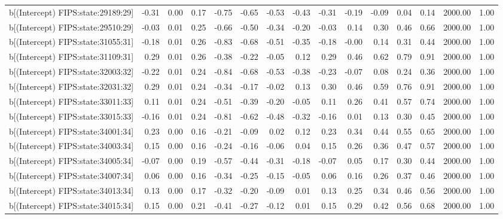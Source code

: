 \begin{table}[ht]
\begin{tabular}{rrrrrrrrrrrrrrr}
  b[(Intercept) FIPS:state:29189:29] & -0.31 & 0.00 & 0.17 & -0.75 & -0.65 & -0.53 & -0.43 & -0.31 & -0.19 & -0.09 & 0.04 & 0.14 & 2000.00 & 1.00 \\ 
  b[(Intercept) FIPS:state:29510:29] & -0.03 & 0.01 & 0.25 & -0.66 & -0.50 & -0.34 & -0.20 & -0.03 & 0.14 & 0.30 & 0.46 & 0.66 & 2000.00 & 1.00 \\ 
  b[(Intercept) FIPS:state:31055:31] & -0.18 & 0.01 & 0.26 & -0.83 & -0.68 & -0.51 & -0.35 & -0.18 & -0.00 & 0.14 & 0.31 & 0.44 & 2000.00 & 1.00 \\ 
  b[(Intercept) FIPS:state:31109:31] & 0.29 & 0.01 & 0.26 & -0.38 & -0.22 & -0.05 & 0.12 & 0.29 & 0.46 & 0.62 & 0.79 & 0.91 & 2000.00 & 1.00 \\ 
  b[(Intercept) FIPS:state:32003:32] & -0.22 & 0.01 & 0.24 & -0.84 & -0.68 & -0.53 & -0.38 & -0.23 & -0.07 & 0.08 & 0.24 & 0.36 & 2000.00 & 1.00 \\ 
  b[(Intercept) FIPS:state:32031:32] & 0.29 & 0.01 & 0.24 & -0.34 & -0.17 & -0.02 & 0.13 & 0.30 & 0.46 & 0.59 & 0.76 & 0.91 & 2000.00 & 1.00 \\ 
  b[(Intercept) FIPS:state:33011:33] & 0.11 & 0.01 & 0.24 & -0.51 & -0.39 & -0.20 & -0.05 & 0.11 & 0.26 & 0.41 & 0.57 & 0.74 & 2000.00 & 1.00 \\ 
  b[(Intercept) FIPS:state:33015:33] & -0.16 & 0.01 & 0.24 & -0.81 & -0.62 & -0.48 & -0.32 & -0.16 & 0.01 & 0.13 & 0.30 & 0.45 & 2000.00 & 1.00 \\ 
  b[(Intercept) FIPS:state:34001:34] & 0.23 & 0.00 & 0.16 & -0.21 & -0.09 & 0.02 & 0.12 & 0.23 & 0.34 & 0.44 & 0.55 & 0.65 & 2000.00 & 1.00 \\ 
  b[(Intercept) FIPS:state:34003:34] & 0.15 & 0.00 & 0.16 & -0.24 & -0.16 & -0.06 & 0.04 & 0.15 & 0.26 & 0.36 & 0.47 & 0.57 & 2000.00 & 1.00 \\ 
  b[(Intercept) FIPS:state:34005:34] & -0.07 & 0.00 & 0.19 & -0.57 & -0.44 & -0.31 & -0.18 & -0.07 & 0.05 & 0.17 & 0.30 & 0.44 & 2000.00 & 1.00 \\ 
  b[(Intercept) FIPS:state:34007:34] & 0.06 & 0.00 & 0.16 & -0.34 & -0.25 & -0.15 & -0.05 & 0.06 & 0.16 & 0.26 & 0.37 & 0.46 & 2000.00 & 1.00 \\ 
  b[(Intercept) FIPS:state:34013:34] & 0.13 & 0.00 & 0.17 & -0.32 & -0.20 & -0.09 & 0.01 & 0.13 & 0.25 & 0.34 & 0.46 & 0.56 & 2000.00 & 1.00 \\ 
  b[(Intercept) FIPS:state:34015:34] & 0.15 & 0.00 & 0.21 & -0.41 & -0.27 & -0.12 & 0.01 & 0.15 & 0.29 & 0.42 & 0.56 & 0.68 & 2000.00 & 1.00 \\ 

\end{tabular}
\end{table}
